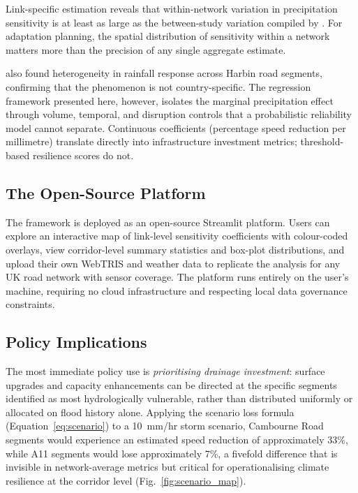 \documentclass[review,authoryear]{elsarticle}
\begin{document}
Link-specific estimation reveals that within-network variation in precipitation sensitivity is at least as large as the between-study variation compiled by \citet{koetse2009impact}. For adaptation planning, the spatial distribution of sensitivity within a network matters more than the precision of any single aggregate estimate.

\citet{gao2024resilience} also found heterogeneity in rainfall response across Harbin road segments, confirming that the phenomenon is not country-specific. The regression framework presented here, however, isolates the marginal precipitation effect through volume, temporal, and disruption controls that a probabilistic reliability model cannot separate. Continuous coefficients (percentage speed reduction per millimetre) translate directly into infrastructure investment metrics; threshold-based resilience scores do not.

\subsection{The Open-Source Platform}
\label{sec:disc:platform}

The framework is deployed as an open-source Streamlit platform. Users can explore an interactive map of link-level sensitivity coefficients with colour-coded overlays, view corridor-level summary statistics and box-plot distributions, and upload their own WebTRIS and weather data to replicate the analysis for any UK road network with sensor coverage. The platform runs entirely on the user's machine, requiring no cloud infrastructure and respecting local data governance constraints.

\subsection{Policy Implications}
\label{sec:disc:policy}

The most immediate policy use is \textit{prioritising drainage investment}: surface upgrades and capacity enhancements can be directed at the specific segments identified as most hydrologically vulnerable, rather than distributed uniformly or allocated on flood history alone. Applying the scenario loss formula (Equation~\ref{eq:scenario}) to a 10~\si{mm/hr} storm scenario, Cambourne Road segments would experience an estimated speed reduction of approximately 33\%, while A11 segments would lose approximately 7\%, a fivefold difference that is invisible in network-average metrics but critical for operationalising climate resilience at the corridor level (Fig.~\ref{fig:scenario_map}).
\end{document}
